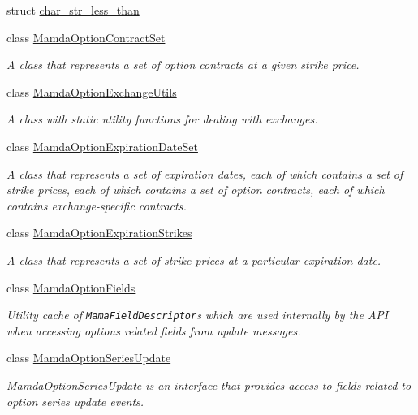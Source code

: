 \begin{CompactItemize}
struct \hyperlink{structWombat_1_1char__str__less__than}{char\_\-str\_\-less\_\-than}
\item 
class \hyperlink{classWombat_1_1MamdaOptionContractSet}{Mamda\-Option\-Contract\-Set}
\begin{CompactList}\small\item\em A class that represents a set of option contracts at a given strike price. \item\end{CompactList}\item 
class \hyperlink{classWombat_1_1MamdaOptionExchangeUtils}{Mamda\-Option\-Exchange\-Utils}
\begin{CompactList}\small\item\em A class with static utility functions for dealing with exchanges. \item\end{CompactList}\item 
class \hyperlink{classWombat_1_1MamdaOptionExpirationDateSet}{Mamda\-Option\-Expiration\-Date\-Set}
\begin{CompactList}\small\item\em A class that represents a set of expiration dates, each of which contains a set of strike prices, each of which contains a set of option contracts, each of which contains exchange-specific contracts. \item\end{CompactList}\item 
class \hyperlink{classWombat_1_1MamdaOptionExpirationStrikes}{Mamda\-Option\-Expiration\-Strikes}
\begin{CompactList}\small\item\em A class that represents a set of strike prices at a particular expiration date. \item\end{CompactList}\item 
class \hyperlink{classWombat_1_1MamdaOptionFields}{Mamda\-Option\-Fields}
\begin{CompactList}\small\item\em Utility cache of {\tt Mama\-Field\-Descriptor}s which are used internally by the API when accessing options related fields from update messages. \item\end{CompactList}\item 
class \hyperlink{classWombat_1_1MamdaOptionSeriesUpdate}{Mamda\-Option\-Series\-Update}
\begin{CompactList}\small\item\em \hyperlink{classWombat_1_1MamdaOptionSeriesUpdate}{Mamda\-Option\-Series\-Update} is an interface that provides access to fields related to option series update events. \item\end{CompactList}\item 

\end{CompactItemize}
